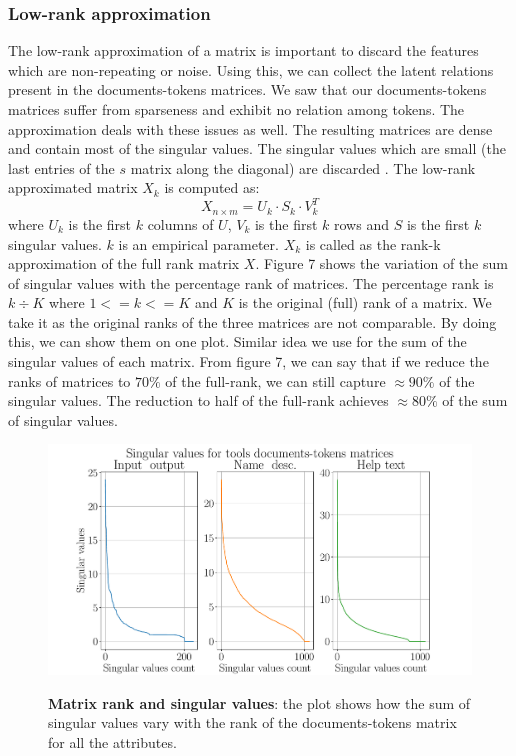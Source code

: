     \subsubsection{Low-rank approximation}
    The low-rank approximation of a matrix is important to discard the features which are non-repeating or noise. Using this, we can collect the latent relations present in the documents-tokens matrices. We saw that our documents-tokens matrices suffer from sparseness and exhibit no relation among tokens. The approximation deals with these issues as well. The resulting matrices are dense and contain most of the singular values. The singular values which are small (the last entries of the $s$ matrix along the diagonal) are discarded \cite{DBLP:journals/corr/Yang15b}. The low-rank approximated matrix $X_k$ is computed as:
    \begin{equation}
    X_{n \times m} = U_{k} \cdot S_{k} \cdot V_{k}^T
    \end{equation}
    where $U_{k}$ is the first $k$ columns of $U$, $V_{k}$ is the first $k$ rows and $S$ is the first $k$ singular values. $k$ is an empirical parameter. $X_k$ is called as the rank-k approximation of the full rank matrix $X$. Figure 7 shows the variation of the sum of singular values with the percentage rank of matrices. The percentage rank is $k \div K$ where $1 <= k <= K$ and $K$ is the original (full) rank of a matrix. We take it as the original ranks of the three matrices are not comparable. By doing this, we can show them on one plot. Similar idea we use for the sum of the singular values of each matrix. From figure 7, we can say that if we reduce the ranks of matrices to $70\%$ of the full-rank, we can still capture $\approx 90\%$ of the singular values. The reduction to half of the full-rank achieves $\approx 80\%$ of the sum of singular values. 

\begin{figure}[h]
\begin{centering}
    {\includegraphics[scale=0.45]{figures/singular_values.pdf}}
    \caption[Rank singular values]{\textbf{Matrix rank and singular values}: the plot shows how the sum of singular values vary with the rank of the documents-tokens matrix for all the attributes.}
\end{centering}
\end{figure}


